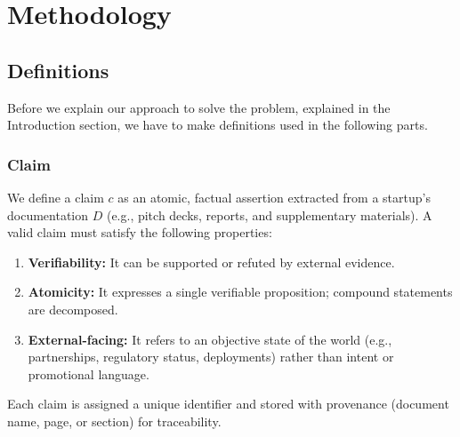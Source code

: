 \section{Methodology}
\subsection{Definitions}
Before we explain our approach to solve the problem, explained in the Introduction section, we have to make definitions used in the following parts.
\subsubsection{Claim}
We define a claim $c$ as an atomic, factual assertion extracted from a startup’s documentation $D$ (e.g., pitch decks, reports, and supplementary materials). A valid claim must satisfy the following properties:
\begin{enumerate}
    \item \textbf{Verifiability:} It can be supported or refuted by external evidence.
    \item \textbf{Atomicity:} It expresses a single verifiable proposition; compound statements are decomposed.
    \item \textbf{External-facing:} It refers to an objective state of the world (e.g., partnerships, regulatory status, deployments) rather than intent or promotional language.
\end{enumerate}
Each claim is assigned a unique identifier and stored with provenance (document name, page, or section) for traceability.


